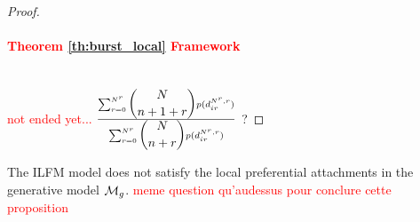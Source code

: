 \begin{proof}
    \paragraph{\textcolor{red}{Theorem \ref{th:burst_local} Framework }}~\\

    \textcolor{red}{not ended yet...} $\frac{\sum_{r=0}^{N^r}\dbinom{N}{n+1+r} p(d_{ir}^{N^r,r})}{\sum_{r=0}^{N^r} \dbinom{N}{n+r} p(d_{ir}^{N^r,r})}$ ?

\end{proof}

\begin{proposition}
    The ILFM model does not satisfy the local preferential attachments in the generative model $\mathcal{M}_g$. \textcolor{red}{ meme question qu'audessus pour conclure cette proposition}
\end{proposition}

